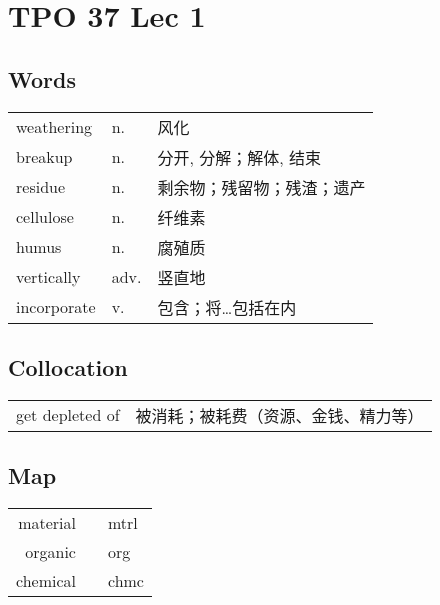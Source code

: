 \section{TPO 37 Lec 1}

\subsection{Words}

\begin{tabular}{lll}
    weathering  & n.   & 风化            \\
    breakup     & n.   & 分开, 分解；解体, 结束 \\
    residue     & n.   & 剩余物；残留物；残渣；遗产 \\
    cellulose   & n.   & 纤维素           \\
    humus       & n.   & 腐殖质           \\
    vertically  & adv. & 竖直地           \\
    incorporate & v.   & 包含；将…包括在内     \\
\end{tabular}

\subsection{Collocation}

\begin{tabular}{ll}
    get depleted of & 被消耗；被耗费（资源、金钱、精力等） \\
\end{tabular}

\subsection{Map}

\begin{tabular}{rc@{\quad$\to$\quad}l}
    material &  & mtrl \\
    organic  &  & org  \\
    chemical &  & chmc \\
\end{tabular}
